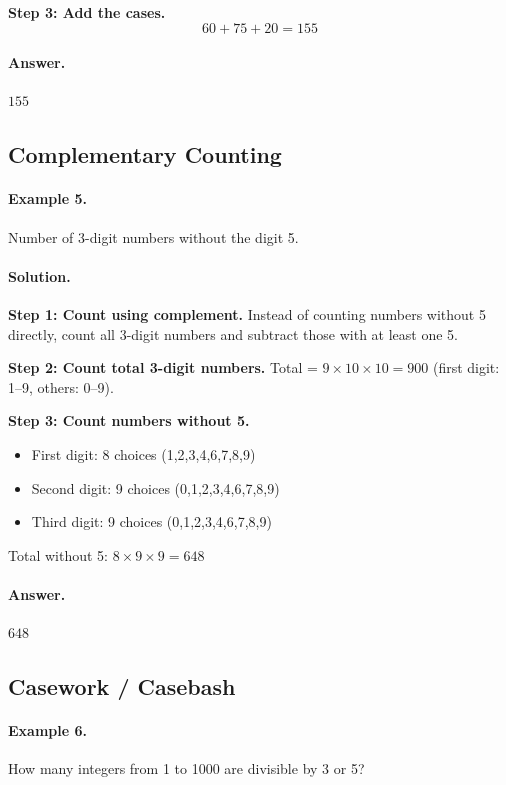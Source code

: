 \documentclass[12pt]{extarticle}
\begin{document}
\textbf{Step 3: Add the cases.}
\[
60 + 75 + 20 = 155
\]

\paragraph{Answer.} $\boxed{155}$

\subsection{Complementary Counting}

\paragraph{Example 5.} Number of 3-digit numbers without the digit 5.

\paragraph{Solution.}
\textbf{Step 1: Count using complement.} Instead of counting numbers without 5 directly, count all 3-digit numbers and subtract those with at least one 5.

\textbf{Step 2: Count total 3-digit numbers.} Total = $9 \times 10 \times 10 = 900$ (first digit: 1--9, others: 0--9).

\textbf{Step 3: Count numbers without 5.} 
\begin{itemize}
    \item First digit: 8 choices (1,2,3,4,6,7,8,9)
    \item Second digit: 9 choices (0,1,2,3,4,6,7,8,9)
    \item Third digit: 9 choices (0,1,2,3,4,6,7,8,9)
\end{itemize}
Total without 5: $8 \times 9 \times 9 = 648$

\paragraph{Answer.} $\boxed{648}$

\subsection{Casework / Casebash}

\paragraph{Example 6.} How many integers from 1 to 1000 are divisible by 3 or 5?
\end{document}
